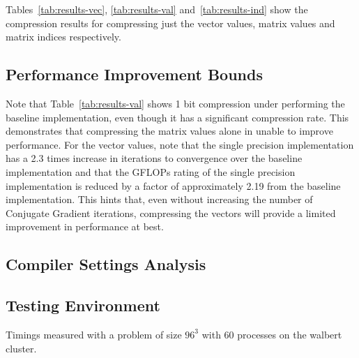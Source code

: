 
Tables~\ref{tab:results-vec}, \ref{tab:results-val} and~\ref{tab:results-ind} show the compression results for compressing just the vector values, matrix values and matrix indices respectively.





\subsection{Performance Improvement Bounds}
\label{sec:results-bounds}
Note that Table~\ref{tab:results-val} shows 1 bit compression under performing the baseline implementation, even though it has a significant compression rate.
This demonstrates that compressing the matrix values alone in unable to improve performance.
For the vector values, note that the single precision implementation has a 2.3 times increase in iterations to convergence over the baseline implementation and that the GFLOPs rating of the single precision implementation is reduced by a factor of approximately 2.19 from the baseline implementation.
This hints that, even without increasing the number of Conjugate Gradient iterations, compressing the vectors will provide a limited improvement in performance at best.

\subsection{Compiler Settings Analysis}

\subsection{Testing Environment}
Timings measured with a problem of size \(96^3\) with 60 processes on the walbert cluster.